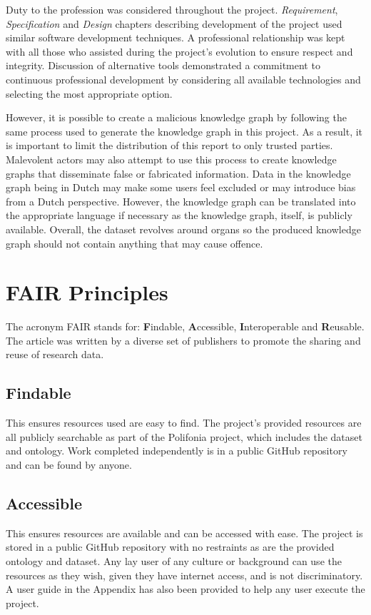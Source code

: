 Duty to the profession was considered throughout the project. \textit{Requirement}, \textit{Specification} and \textit{Design} chapters describing development of the project used similar software development techniques. A professional relationship was kept with all those who assisted during the project's evolution to ensure respect and integrity. Discussion of alternative tools demonstrated a commitment to continuous professional development by considering all available technologies and selecting the most appropriate option.

However, it is possible to create a malicious knowledge graph by following the same process used to generate the knowledge graph in this project. As a result, it is important to limit the distribution of this report to only trusted parties. Malevolent actors may also attempt to use this process to create knowledge graphs that disseminate false or fabricated information. Data in the knowledge graph being in Dutch may make some users feel excluded or may introduce bias from a Dutch perspective. However, the knowledge graph can be translated into the appropriate language if necessary as the knowledge graph, itself, is publicly available. Overall, the dataset revolves around organs so the produced knowledge graph should not contain anything that may cause offence.

\section{FAIR Principles}
\hspace{0.5cm} The acronym FAIR stands for: \textbf{F}indable, \textbf{A}ccessible, \textbf{I}nteroperable and \textbf{R}eusable. The article \cite{fairprinciples} was written by a diverse set of publishers to promote the sharing and reuse of research data. 

\subsection{Findable}
\hspace{0.5cm} This ensures resources used are easy to find. The project's provided resources are all publicly searchable as part of the Polifonia project, which includes the dataset and ontology. Work completed independently is in a public GitHub repository and can be found by anyone. 

\subsection{Accessible}
\hspace{0.5cm} This ensures resources are available and can be accessed with ease. The project is stored in a public GitHub repository with no restraints as are the provided ontology and dataset. Any lay user of any culture or background can use the resources as they wish, given they have internet access, and is not discriminatory. A user guide in the Appendix has also been provided to help any user execute the project. 

